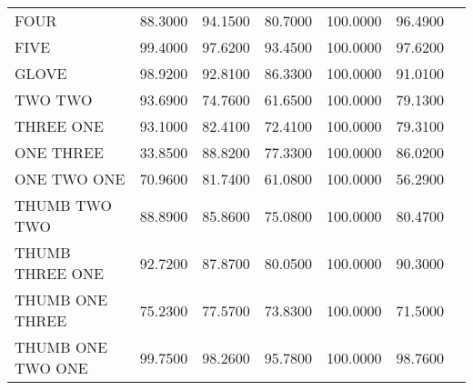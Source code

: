 \begin{landscape}
\begin{table}[]
\begin{tabular}{l|rrrrrr}
FOUR              & 88.3000           & 94.1500           & 80.7000           & 100.0000          & 96.4900           &  \\
FIVE              & 99.4000           & 97.6200           & 93.4500           & 100.0000          & 97.6200           &  \\
GLOVE             & 98.9200           & 92.8100           & 86.3300           & 100.0000          & 91.0100           &  \\
TWO TWO           & 93.6900           & 74.7600           & 61.6500           & 100.0000          & 79.1300           &  \\
THREE ONE         & 93.1000           & 82.4100           & 72.4100           & 100.0000          & 79.3100           &  \\
ONE THREE         & 33.8500           & 88.8200           & 77.3300           & 100.0000          & 86.0200           &  \\
ONE TWO ONE       & 70.9600           & 81.7400           & 61.0800           & 100.0000          & 56.2900           &  \\
THUMB TWO TWO     & 88.8900           & 85.8600           & 75.0800           & 100.0000          & 80.4700           &  \\
THUMB THREE ONE   & 92.7200           & 87.8700           & 80.0500           & 100.0000          & 90.3000           &  \\
THUMB ONE THREE   & 75.2300           & 77.5700           & 73.8300           & 100.0000          & 71.5000           &  \\
THUMB ONE TWO ONE & 99.7500           & 98.2600           & 95.7800           & 100.0000          & 98.7600           & 
\end{tabular}
\end{table}
\end{landscape}

